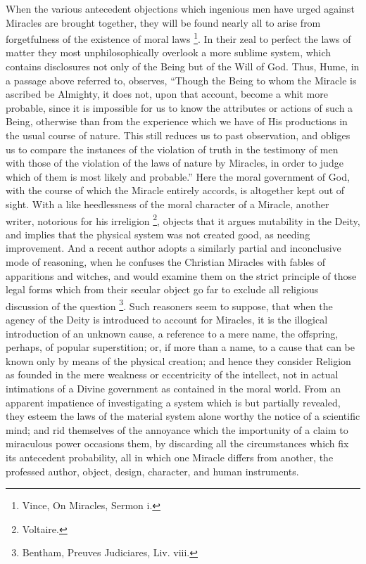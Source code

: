 When the various antecedent objections which
ingenious men have urged against Miracles are brought together, they
will be found nearly all to arise from forgetfulness of the existence
of moral laws \footnote{Vince, On Miracles, Sermon
i.}. In their zeal to perfect
the laws of matter they most unphilosophically overlook a more sublime
system, which contains disclosures not only of the Being but of the
Will of God. Thus, Hume, in a passage above referred to, observes, ``Though the Being to whom the Miracle is ascribed be Almighty, it
does not, upon that account, become a whit more probable, since it is
impossible for us to know the attributes or actions of such a Being,
otherwise than from the experience which we have of His productions in
the usual course of nature. This still reduces us to past observation,
and obliges us to compare the instances of the violation of truth in
the testimony of men with those of the violation of the laws of
nature by Miracles, in order to judge which of them is most likely and
probable.'' Here the moral government of God, with the course of
which the Miracle entirely accords, is altogether kept out of sight.
With a like heedlessness of the moral character of a Miracle, another
writer, notorious for his irreligion \footnote{Voltaire.},
objects that it argues mutability in the Deity, and implies that the
physical system was not created good, as needing improvement. And a
recent author adopts a similarly partial and inconclusive mode of
reasoning, when he confuses the Christian Miracles with fables of
apparitions and witches, and would examine them on the strict
principle of those legal forms which from their secular object go far
to exclude all religious discussion of the question \footnote{Bentham, Preuves Judiciares, Liv. viii.}. Such reasoners seem to suppose, that when the agency of the Deity
is introduced to account for Miracles, it is the illogical
introduction of an unknown cause, a reference to a mere name, the
offspring, perhaps, of popular superstition; or, if more than a name,
to a cause that can be known only by means of the physical creation;
and hence they consider Religion as founded in the mere weakness or
eccentricity of the intellect, not in actual intimations of a Divine
government as contained in the moral world. From an apparent
impatience of investigating a system which is but partially
revealed, they esteem the laws of the material system alone worthy the
notice of a scientific mind; and rid themselves of the annoyance which
the importunity of a claim to miraculous power occasions them, by
discarding all the circumstances which fix its antecedent probability,
all in which one Miracle differs from another, the professed author,
object, design, character, and human instruments.

